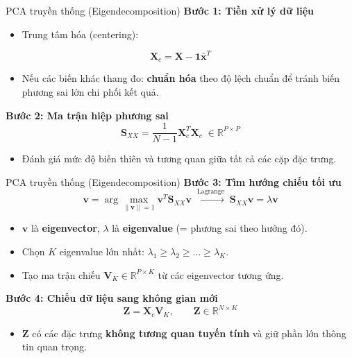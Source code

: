 \begin{frame}{PCA truyền thống (Eigendecomposition)}
	\small
	\textbf{Bước 1: Tiền xử lý dữ liệu}
	\begin{itemize}
		\item Trung tâm hóa (centering):
	\end{itemize}
	\[
		\mathbf{X}_c = \mathbf{X} - \mathbf{1}\bar{\mathbf{x}}^T
	\]
	\begin{itemize}
		\item Nếu các biến khác thang đo: \textbf{chuẩn hóa} theo độ lệch chuẩn để tránh biến phương sai lớn chi phối kết quả.
	\end{itemize}

	\vspace{0.3em}
	\textbf{Bước 2: Ma trận hiệp phương sai}
	\[
		\mathbf{S}_{XX}=\frac{1}{N-1}\mathbf{X}_c^T\mathbf{X}_c \;\in\mathbb{R}^{P\times P}
	\]
	\begin{itemize}
		\item Đánh giá mức độ biến thiên và tương quan giữa tất cả các cặp đặc trưng.
	\end{itemize}
\end{frame}

\begin{frame}{PCA truyền thống (Eigendecomposition)}
	\small
	\textbf{Bước 3: Tìm hướng chiếu tối ưu}
	\[
		\mathbf{v}=\arg\max_{\|\mathbf{v}\|=1}\mathbf{v}^T\mathbf{S}_{XX}\mathbf{v}
		\;\xrightarrow{\text{Lagrange}}\;
		\mathbf{S}_{XX}\mathbf{v}=\lambda\mathbf{v}
	\]
	\begin{itemize}
		\item $\mathbf{v}$ là \textbf{eigenvector}, $\lambda$ là \textbf{eigenvalue} (= phương sai theo hướng đó).
		\item Chọn $K$ eigenvalue lớn nhất: $\lambda_1\ge\lambda_2\ge\dots\ge\lambda_K$.
		\item Tạo ma trận chiếu $\mathbf{V}_K\in\mathbb{R}^{P\times K}$ từ các eigenvector tương ứng.
	\end{itemize}

	\vspace{0.2em}
	\textbf{Bước 4: Chiếu dữ liệu sang không gian mới}
	\[
		\mathbf{Z}=\mathbf{X}_c\mathbf{V}_K,\qquad \mathbf{Z}\in\mathbb{R}^{N\times K}
	\]
	\begin{itemize}
		\item $\mathbf{Z}$ có các đặc trưng \textbf{không tương quan tuyến tính} và giữ phần lớn thông tin quan trọng.
	\end{itemize}
\end{frame}

